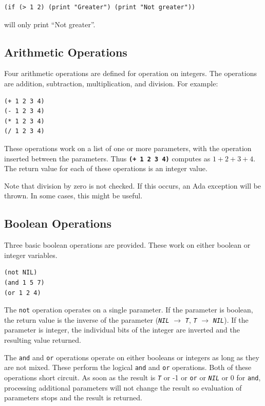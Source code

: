 \documentclass[10pt, openany]{book}
\newcommand{\operation}[1]{\textbf{\texttt{#1}}}
\newcommand{\function}[1]{\texttt{#1}}
\newcommand{\constant}[1]{\emph{\texttt{#1}}}
\begin{document}
\begin{lstlisting}
(if (> 1 2) (print "Greater") (print "Not greater"))
\end{lstlisting}

will only print ``Not greater''.

\subsection{Arithmetic Operations}
Four arithmetic operations are defined for operation on integers.  The operations are addition, subtraction, multiplication, and division.  For example:
\begin{lstlisting}
(+ 1 2 3 4)
(- 1 2 3 4)
(* 1 2 3 4)
(/ 1 2 3 4)
\end{lstlisting}

These operations work on a list of one or more parameters, with the operation inserted between the parameters.  Thus \operation{(+ 1 2 3 4)} computes as $1+2+3+4$.  The return value for each of these operations is an integer value.

Note that division by zero is not checked.  If this occurs, an Ada exception will be thrown.  In some cases, this might be useful.

\subsection{Boolean Operations}
Three basic boolean operations are provided.  These work on either boolean or integer variables.
\begin{lstlisting}
(not NIL)
(and 1 5 7)
(or 1 2 4)
\end{lstlisting}

The \function{not} operation operates on a single parameter.  If the parameter is boolean, the return value is the inverse of the parameter (\constant{NIL} $\rightarrow$ \constant{T}, \constant{T} $\rightarrow$ \constant{NIL}).  If the parameter is integer, the individual bits of the integer are inverted and the resulting value returned.

The \function{and} and \function{or} operations operate on either booleans or integers as long as they are not mixed.  These perform the logical \function{and} and \function{or} operations.  Both of these operations short circuit.  As soon as the result is \constant{T} or -1 or \function{or} or \constant{NIL} or 0 for \function{and},  processing additional parameters will not change the result so evaluation of parameters stops and the result is returned.
\end{document}
